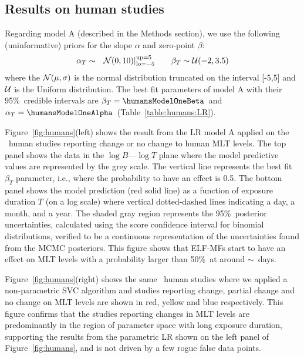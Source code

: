 \documentclass[letter,twoside]{article}
\begin{document}
 
 
\subsection*{Results on human studies} 
\label{section:results:human}

Regarding model A (described in the Methods section), we use   the following (uninformative) priors for the slope $\alpha$ and zero-point $\beta$:
\begin{eqnarray}
\alpha_T&\sim& {\cal N}(0,10)|_{\rm lo=-5}^{\rm up=5}\qquad
\beta_T\sim{\cal U}(-2,3.5)\label{eq:priors:linearT}
\end{eqnarray}
where  the ${\cal N}(\mu,\sigma)$ is the normal distribution truncated on the interval [-5,5] and ${\cal U}$ is the Uniform distribution.
The best fit parameters of model A with their 95\%\ credible intervals are  $\beta_T=\humansModelOneBeta$\humansModelOneBetaErr\  and  $\alpha_T=\humansModelOneAlpha$\humansModelOneAlphaErr\ (Table~\ref{table:humans:LR}).

Figure~\ref{fig:humans}(left) shows the result from the LR model A applied on the \Nhums\ human studies reporting change or no change to human MLT levels. The top panel shows the data in the  $\log B$---$\log T$ plane where the model predictive values are represented by the grey scale. The vertical line represents the best fit $\beta_T$ parameter, i.e., where the probability to have an effect is  0.5.
The bottom panel shows the model prediction (red solid line) as a function of  exposure duration $T$ (on a log scale)  where vertical dotted-dashed lines indicating a day, a month, and a year.  The shaded gray region represents the 95\%\ posterior uncertainties, calculated using the \citet{Wilson1927} score confidence interval  for binomial distributions, verified to be a continuous representation of the uncertainties found from the MCMC posteriors.  
This figure shows that ELF-MFs start to have  an effect on MLT levels  with a probability larger than 50\%\ at around $\sim$\humansModelOneBetaDays~days. 

Figure~\ref{fig:humans}(right) shows the same  \Nhums\ human studies  where we applied a  non-parametric SVC algorithm  and studies reporting change, partial change and no change on MLT levels are shown in red, yellow and blue respectively.
This figure confirms that the studies reporting changes in MLT levels are predominantly in the region of parameter space with long exposure duration, supporting the results from the parametric LR shown on the left panel of Figure~\ref{fig:humans}, and is not driven by a few rogue false data points. 
\end{document}
